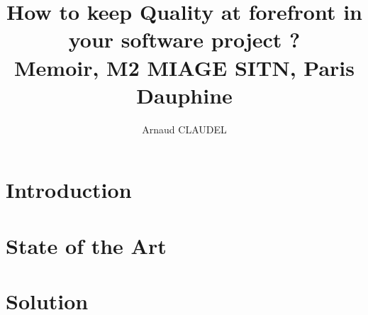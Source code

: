 \documentclass{report}
\title{
How to keep Quality at forefront in your software project ?
\\ {\large Memoir, M2 MIAGE SITN, Paris Dauphine}}
\author{Arnaud CLAUDEL}
\begin{document}
    \maketitle
    \tableofcontents

    \chapter{Introduction}\label{ch:introduction}
    

    \chapter{State of the Art}\label{ch:state-of-the-art}
    

    \chapter{Solution}\label{ch:solution}
    
\end{document}

